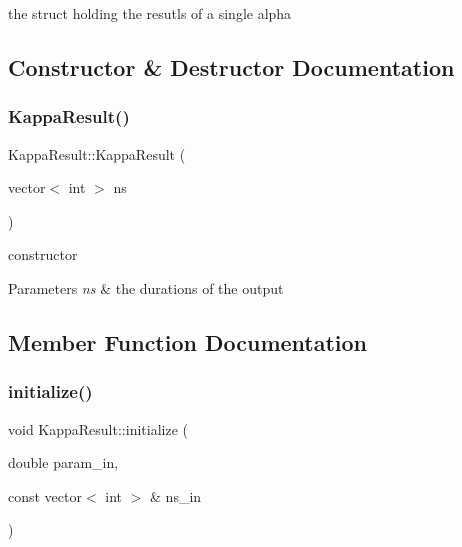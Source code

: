 the struct holding the resutls of a single alpha 

\subsection{Constructor \& Destructor Documentation}
\mbox{\label{structKappaResult_ac0ca82b62ef4f9717ab9e136b251668b}} 
\subsubsection{\texorpdfstring{Kappa\+Result()}{KappaResult()}}
{\footnotesize\ttfamily Kappa\+Result\+::\+Kappa\+Result (\begin{DoxyParamCaption}\item[{vector$<$ int $>$}]{ns }\end{DoxyParamCaption})\hspace{0.3cm}{\ttfamily [inline]}}



constructor 


\begin{DoxyParams}{Parameters}
{\em ns} & the durations of the output \\
\hline
\end{DoxyParams}


\subsection{Member Function Documentation}
\mbox{\label{structKappaResult_a73d7fdfa72149f5ec74b22a203f418b9}} 
\subsubsection{\texorpdfstring{initialize()}{initialize()}}
{\footnotesize\ttfamily void Kappa\+Result\+::initialize (\begin{DoxyParamCaption}\item[{double}]{param\+\_\+in,  }\item[{const vector$<$ int $>$ \&}]{ns\+\_\+in }\end{DoxyParamCaption})\hspace{0.3cm}{\ttfamily [inline]}}



